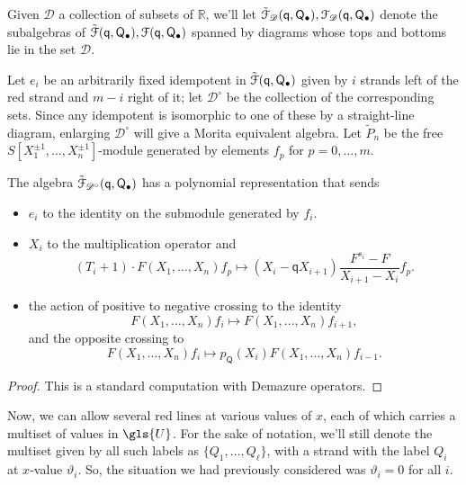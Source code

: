 \documentclass[ALCO,ThmDefs,Unicode,epreuves]{cedram}
\newcommand{\pq}{\mathsf{q}}
\newcommand{\R}{\mathbb{R}}
\newcommand{\PQ}{\mathsf{Q}}
\begin{document}
Given ${\mathscr{D}}$ a collection of subsets of $\R$, we'll let $\tilde{\EuScript{F}}_{\mathscr{D}}
(\pq,\PQ_{\bullet}),{\EuScript{F}}_{\mathscr{D}} (\pq,\PQ_{\bullet})$
denote the subalgebras of $\tilde{\EuScript{F}}
(\pq,\PQ_{\bullet}),{\EuScript{F}} (\pq,\PQ_{\bullet})$ spanned by
diagrams whose tops and bottoms lie in the set ${\mathscr{D}}$.


 Let $e_i$ be an arbitrarily fixed idempotent in $\tilde{\EuScript{F}} (\pq,\PQ_{\bullet})$ given by
 $i$ strands left of the red strand and $m-i$ right of it; let
 $\mathscr{D}^\circ$ be the collection of the corresponding
 sets. Since any idempotent is isomorphic to one of these by a
 straight-line diagram, enlarging $\mathscr{D}^\circ$ will give a
 Morita equivalent algebra. Let
 $\tilde{P}_n$ be the free $S[X_1^{\pm 1},\dots, X_n^{\pm 1}]$-module generated
 by elements $f_p$ for $p=0,\dots, m$.
\begin{prop}\label{tilde-poly}
 The algebra $\tilde{\EuScript{F}}_{\mathscr{D}^\circ} (\pq,\PQ_{\bullet})$ has a polynomial
 representation that sends
 \begin{itemize}
\item $e_i$ to the identity on the submodule generated by $f_i$.
\item $X_i$ to the multiplication operator and \[(T_i+1)\cdot
 F(X_1,\dots,X_n)f_p\mapsto (X_i-\pq X_{i+1})\frac{F^{s_i}-F}{X_{i+1}-X_i}f_p.\]
 \item the action of positive to negative crossing to the identity
 \[F(X_1,\dots,X_n)f_i\mapsto
 F(X_1,\dots,X_n)f_{i+1},\] and the opposite crossing to
 \[F(X_1,\dots,X_n)f_i\mapsto
 p_\PQ(X_i)F(X_1,\dots,X_n)f_{i-1}.\]
 \end{itemize}
\end{prop}
\begin{proof}
 This is a standard computation with Demazure operators.
\end{proof}


Now, we can allow several red
lines at various values of $x$, each of which carries a multiset of
values in $\gls{U}$. For the sake of notation, we'll still denote the
multiset given by all such labels as $\{Q_1,\dots, Q_\ell\}$, with a strand with the label
$Q_{i}$ at $x$-value
$\vartheta_i$. So, the situation we had previously considered was
$\vartheta_i=0$ for all $i$.
\end{document}

